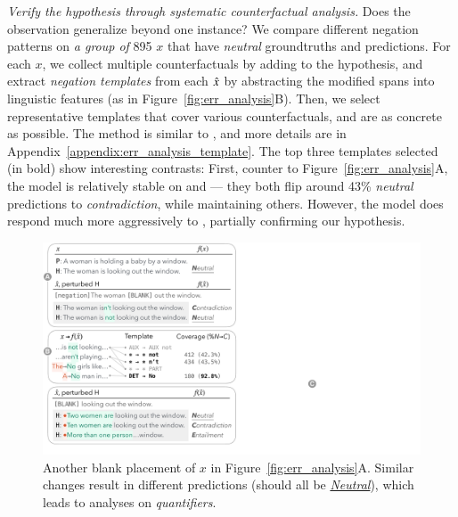 \emph{Verify the hypothesis through systematic counterfactual analysis.}
Does the observation generalize beyond one instance? 
We compare different negation patterns on \emph{a group of} 895 $x$ that have \emph{neutral} groundtruths and predictions.
For each $x$, we collect multiple counterfactuals by adding  to the hypothesis, and extract \emph{negation templates} from each $\hat{x}$ by abstracting the modified spans into linguistic features (as in Figure~\ref{fig:err_analysis}B).
Then, we select representative templates that cover various counterfactuals, and are as concrete as possible. 
The method is similar to \citet{wu2020tempura}, and more details are in Appendix~\ref{appendix:err_analysis_template}.
The top three templates selected (in bold) show interesting contrasts:
First, counter to Figure~\ref{fig:err_analysis}A, the model is relatively stable on  and  --- they both flip around 43\% \emph{neutral} predictions to \emph{contradiction}, while maintaining others.
However, the model does respond much more aggressively to , partially confirming our hypothesis.

\begin{figure}[t]
\centering
\includegraphics[trim={0.5cm 1.8cm 32.5cm 25.5cm},clip,width=1\columnwidth]{figures/err_analysis.pdf}
\vspace{-15pt}
\caption{
Another blank placement of $x$ in Figure~\ref{fig:err_analysis}A. 
Similar changes result in different predictions (should all be \uline{\emph{Neutral}}), which leads to analyses on \emph{quantifiers}.
}
\vspace{-10pt}
\label{fig:err_analysis_quantifier}
\end{figure}


